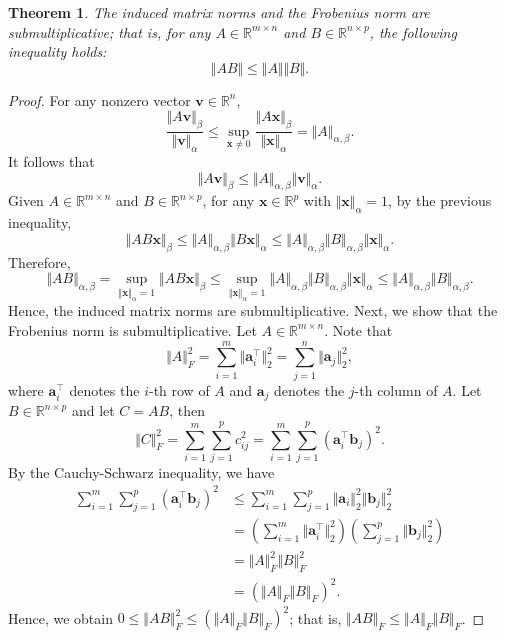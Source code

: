 \documentclass[12pt]{article}
\newtheorem{theorem}{Theorem}[subsection]
\theoremstyle{definition}
\begin{document}
\begin{theorem}
    The induced matrix norms and the Frobenius norm are submultiplicative; that is, for any $A\in\mathbb{R}^{m\times n}$ and $B\in\mathbb{R}^{n\times p}$, the following inequality holds:
    \[ \Vert AB \Vert \leq \Vert A \Vert \Vert B \Vert. \]
\end{theorem}
\begin{proof}
    For any nonzero vector $\mathbf{v} \in \mathbb{R}^n$,
    \[ \frac{\Vert A\mathbf{v} \Vert_\beta}{\Vert \mathbf{v} \Vert_\alpha} 
    \leq \sup_{\mathbf{x} \neq 0}\frac{\Vert A\mathbf{x} \Vert_\beta}{\Vert \mathbf{x} \Vert_\alpha}
    = \Vert A \Vert_{\alpha,\beta}.
    \]
    It follows that
    \[ \Vert A\mathbf{v} \Vert_\beta
    \leq \Vert A \Vert_{\alpha,\beta} \Vert \mathbf{v} \Vert_\alpha.
    \]
    Given $A\in \mathbb{R}^{m \times n}$ and $B\in \mathbb{R}^{n \times p}$, for any $\mathbf{x} \in \mathbb{R}^p$ with $\Vert \mathbf{x} \Vert_\alpha=1$, by the previous inequality,
    \[ \Vert AB\mathbf{x} \Vert_\beta 
    \leq \Vert A \Vert_{\alpha,\beta} \Vert B \mathbf{x}\Vert_\alpha 
    \leq \Vert A \Vert_{\alpha,\beta}\Vert B \Vert_{\alpha,\beta} \Vert \mathbf{x} \Vert_\alpha.
    \]
    Therefore, 
    \[ \Vert AB \Vert_{\alpha,\beta}
    = \sup_{\Vert \mathbf{x} \Vert_\alpha = 1}{\Vert AB\mathbf{x} \Vert_\beta}
    \leq \sup_{\Vert \mathbf{x} \Vert_\alpha = 1} \Vert A \Vert_{\alpha,\beta}\Vert B \Vert_{\alpha,\beta} \Vert \mathbf{x} \Vert_\alpha
    \leq \Vert A \Vert_{\alpha,\beta}\Vert B \Vert_{\alpha,\beta}.
    \]
    Hence, the induced matrix norms are submultiplicative. Next, we show that the Frobenius norm is submultiplicative. Let $A \in \mathbb{R}^{m \times n}$. Note that
    \[ \Vert A\Vert_F^2
    = \sum_{i=1}^m \Vert \mathbf{a}_i^\top \Vert_2^2
    = \sum_{j=1}^n \Vert \mathbf{a}_j \Vert_2^2,
    \]
    where $\mathbf{a}_i^\top$ denotes the $i$-th row of $A$ and $\mathbf{a}_j$ denotes the $j$-th column of $A$. Let $B\in\mathbb{R}^{n\times p}$ and let $C=AB$, then
    \[ \Vert C\Vert_F^2
    =\sum_{i=1}^m \sum_{j=1}^p {c_{ij}^2}
    =\sum_{i=1}^m \sum_{j=1}^p {(\mathbf{a}_i^\top \mathbf{b}_j)^2}.
    \]
    By the Cauchy-Schwarz inequality, we have
    \begin{align*}
        \sum_{i=1}^m \sum_{j=1}^p {(\mathbf{a}_i^\top \mathbf{b}_j)^2} 
        &\leq \sum_{i=1}^m \sum_{j=1}^p {\Vert \mathbf{a}_i \Vert_2^2 \Vert \mathbf{b}_j \Vert_2^2} \\
        &= \left( \sum_{i=1}^m \Vert \mathbf{a}_i^\top \Vert_2^2 \right) \left( \sum_{j=1}^p \Vert \mathbf{b}_j \Vert_2^2 \right) \\
        &= \Vert A \Vert_F^2 \Vert B \Vert_F^2 \\
        &= (\Vert A \Vert_F \Vert B \Vert_F)^2.
    \end{align*}
    Hence, we obtain $0 \leq \Vert AB\Vert_F^2 \leq (\Vert A \Vert_F \Vert B \Vert_F)^2$; that is, $\Vert AB\Vert_F \leq \Vert A \Vert_F \Vert B \Vert_F$.
\end{proof}
\end{document}

